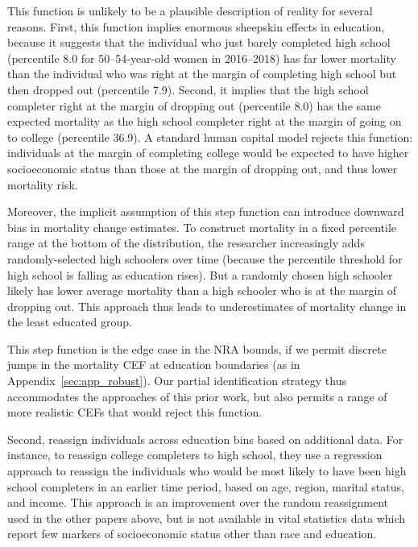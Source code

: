 \documentclass[12pt,letterpaper]{article}
\numberwithin{equation}{section}
\begin{document}
This function is unlikely to be a plausible description of reality for several reasons. First, this function implies enormous sheepskin effects in education, because it suggests that the individual who just barely completed high school (percentile 8.0 for 50--54-year-old women in 2016--2018) has far lower mortality than the individual who was right at the margin of completing high school but then dropped out (percentile 7.9). Second, it implies that the high school completer right at the margin of dropping out (percentile 8.0) has the same expected mortality as the high school completer right at the margin of going on to college (percentile 36.9). A standard human capital model rejects this function: individuals at the margin of completing college would be expected to have higher socioeconomic status than those at the margin of dropping out, and thus lower mortality risk.

Moreover, the implicit assumption of this step function can introduce downward bias in mortality change estimates. To construct mortality in a fixed percentile range at the bottom of the distribution, the researcher increasingly adds randomly-selected high schoolers over time (because the percentile threshold for high school is falling as education rises). But a randomly chosen high schooler likely has lower average mortality than a high schooler who is at the margin of dropping out. This approach thus leads to underestimates of mortality change in the least educated group.

This step function is the edge case in the NRA bounds, if we permit discrete jumps in the mortality CEF at education boundaries (as in Appendix~\ref{sec:app_robust}). Our partial identification strategy thus accommodates the approaches of this prior work, but also permits a range of more realistic CEFs that would reject this function. 

Second, \citet{Cutler2011} reassign individuals across education bins based on additional data. For instance, to reassign college completers to high school, they use a regression approach to reassign the individuals who would be most likely to have been high school completers in an earlier time period, based on age, region, marital status, and income. This approach is an improvement over the random reassignment used in the other papers above, but is not available in vital statistics data which report few markers of socioeconomic status other than race and education.
\end{document}
